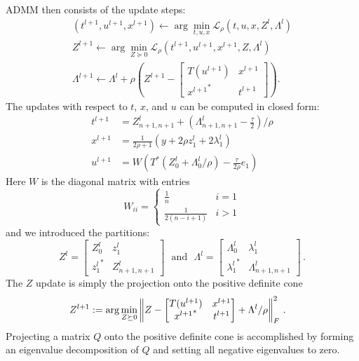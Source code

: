 ADMM then consists of the update steps:
\begin{align*}
(t^{l+1},u^{l+1},x^{l+1})  \leftarrow \arg\min_{t,u,x} \mathcal{L}_\rho(t,u,x,Z^l, \Lambda^l) \\
Z^{l+1}  \leftarrow \arg\min_{Z\succeq 0}  \mathcal{L}_\rho(t^{l+1},u^{l+1},x^{l+1}, Z, \Lambda^l ) \\
\Lambda^{l+1}  \leftarrow \Lambda^l + \rho  \left( Z^{l+1}-\begin{bmatrix}
  T(u^{l+1}) &  x^{l+1} \\
  {x^{l+1}}^* & t^{l+1}
 \end{bmatrix} \right).
\end{align*}
The updates with respect to $t$, $x$, and $u$ can be computed in closed form:
\begin{align*}
    t^{l+1} &= Z_{n+1,n+1}^l+\left(\Lambda_{n+1,n+1}^l-\frac{\tau}{2}\right)/\rho\\
	 x^{l+1} &= \frac{1}{2\rho+1}(y  + 2\rho z_1^{l} + 2\lambda_1^l)\\
    u^{l+1} &= W \left(T^*(Z_0^l+ \Lambda_0^l/\rho) - \frac{\tau }{2\rho} {e}_1\right)
\end{align*}
Here $W$ is the diagonal matrix with entries
\[
	W_{ii} = \begin{cases} 
		\frac{1}{n} & i=1\\
		\frac{1}{2(n-i+1)} & i>1
	\end{cases}
\]
and we introduced the partitions:
\[
	Z^l = \begin{bmatrix} Z_0^l & z_1^l \\ {z_1^l}^* & Z^l_{n+1,n+1} \end{bmatrix} ~~~\mbox{and}~~~
	\Lambda^l = \begin{bmatrix} \Lambda_0^l & \lambda_1^l \\ {\lambda_1^l}^* & \Lambda^l_{n+1,n+1} \end{bmatrix}\,.
\]
The $Z$ update is simply the projection onto the positive definite cone
\begin{equation}\label{eq:z-step}
\hspace{-.3cm}Z^{l+1}:=	 \arg\min_{Z\succeq 0} \left\|Z-\begin{bmatrix}
  T(u^{l+1}) &  x^{l+1} \\
   {x^{l+1}}^* & t^{l+1}
 \end{bmatrix}+\Lambda^{l}/\rho\right\|_F^2\,.
\end{equation}
Projecting a matrix $Q$ onto the positive definite cone is accomplished by
forming an eigenvalue decomposition of $Q$ and setting all negative eigenvalues
to zero.

